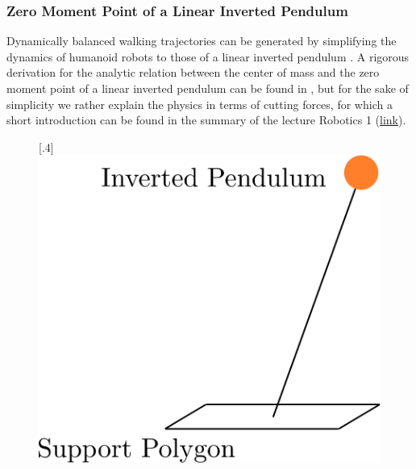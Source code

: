 \subsubsection{Zero Moment Point of a Linear Inverted Pendulum}
Dynamically balanced walking trajectories can be generated by simplifying the dynamics of humanoid robots to those of a linear inverted pendulum \cite{kajita2003biped}. A rigorous derivation for the analytic relation between the center of mass and the zero moment point of a linear inverted pendulum can be found in \cite{kajita2014introduction}, but for the sake of simplicity we rather explain the physics in terms of cutting forces, for which a short introduction can be found in the summary of the lecture Robotics 1 (\href{https://drive.google.com/file/d/1aN1ujXTOlHzO2kLPK7TQRkWfdY-pGzUF/view}{\underline{link}}). 
\begin{figure}[h!]
	\centering
	\subcaptionbox{}%
	[.4\linewidth]{\includegraphics[scale=.3]{chapters/02_background/img/inverted_pendulum.png}}
	\subcaptionbox{}%

\end{figure}
